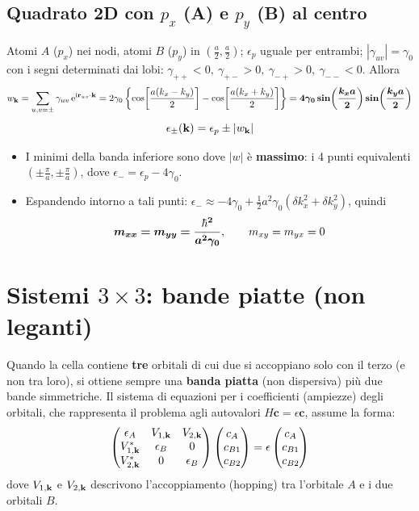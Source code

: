 \subsection{Quadrato 2D con $p_x$ (A) e $p_y$ (B) al centro}
Atomi $A$ ($p_x$) nei nodi, atomi $B$ ($p_y$) in $\left(\frac a2,\frac a2\right)$; $\epsilon_p$ uguale per entrambi; $|\gamma_{uv}|=\gamma_0$ con i segni determinati dai lobi: $\gamma_{++}<0,\ \gamma_{+-}>0,\ \gamma_{-+}>0,\ \gamma_{--}<0$. Allora
\[ w_{\mathbf{k}} = \sum_{u,v=\pm}\gamma_{uv}\,\mathrm{e}^{\mathrm{i} \mathbf{r}_{uv}\cdot\mathbf{k}}
  = 2\gamma_0\left\{\cos\!\left[\frac{a(k_x-k_y)}{2}\right]-\cos\!\left[\frac{a(k_x+k_y)}{2}\right]\right\}
  = \bm{4\gamma_0\sin\!\left(\frac{k_xa}{2}\right)\sin\!\left(\frac{k_ya}{2}\right)} \]
\[ \epsilon_\pm(\mathbf{k}) = \epsilon_p \pm |w_{\mathbf{k}}| \]
\begin{itemize}
  \item I minimi della banda inferiore sono dove $|w|$ è \textbf{massimo}: i 4 punti equivalenti $\left(\pm\frac\pi a,\pm\frac\pi a\right)$, dove $\epsilon_- = \epsilon_p-4\gamma_0$.
  \item Espandendo intorno a tali punti: $\epsilon_-\approx-4\gamma_0+\frac12a^2\gamma_0(\delta k_x^2+\delta k_y^2)$, quindi
  \[ \bm{m_{xx}=m_{yy}=\frac{\hbar^2}{a^2\gamma_0}}, \qquad m_{xy}=m_{yx}=0 \]
\end{itemize}

\section{Sistemi $3\times3$: bande piatte (non leganti)}
Quando la cella contiene \textbf{tre} orbitali di cui due si accoppiano solo con il terzo (e non tra loro), si ottiene sempre una \textbf{banda piatta} (non dispersiva) più due bande simmetriche.
Il sistema di equazioni per i coefficienti (ampiezze) degli orbitali, che rappresenta il problema agli autovalori $H\mathbf{c} = \epsilon\mathbf{c}$, assume la forma:
\[ 
\begin{pmatrix} 
\epsilon_A & V_{1,\mathbf{k}} & V_{2,\mathbf{k}} \\ 
V_{1,\mathbf{k}}^* & \epsilon_B & 0 \\ 
V_{2,\mathbf{k}}^* & 0 & \epsilon_B 
\end{pmatrix} 
\begin{pmatrix} 
c_A \\ c_{B1} \\ c_{B2} 
\end{pmatrix} 
= \epsilon 
\begin{pmatrix} 
c_A \\ c_{B1} \\ c_{B2} 
\end{pmatrix} 
\]
dove $V_{1,\mathbf{k}}$ e $V_{2,\mathbf{k}}$ descrivono l'accoppiamento (hopping) tra l'orbitale $A$ e i due orbitali $B$. 

